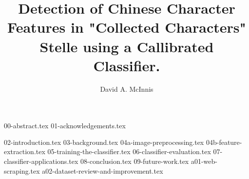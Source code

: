\documentclass{ewuthesis}
\begin{document}
    \title{Detection of Chinese Character Features in "Collected Characters" Stelle using a Callibrated Classifier.}
    \author{David A. McInnis}    
    
    
    
    
    \frontmatter
    \maketitle
    \makesigpage
    \makelibrarystatement{}
    {00-abstract.tex}
    {01-acknowledgements.tex}
    \mainmatter
    \tableofcontents
    \listoffigures{}
    {02-introduction.tex}
    {03-background.tex}
    {04a-image-preprocessing.tex}
    {04b-feature-extraction.tex}
    {05-training-the-classifier.tex}
    {06-classifier-evaluation.tex}
    {07-classifier-applications.tex}
    {08-conclusion.tex}
    {09-future-work.tex}
    \backmatter{}
    {a01-web-scraping.tex}
    {a02-dataset-review-and-improvement.tex}
    
    



    
    \makevita
    
    
\end{document}
